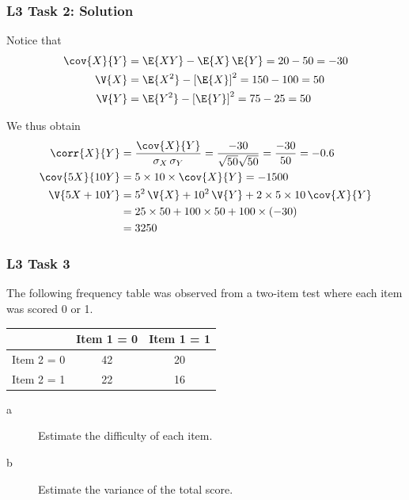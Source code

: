 \documentclass[compress]{beamer}\usepackage[]{graphicx}\usepackage[]{xcolor}
\begin{document}
\begin{frame}[fragile]
  \frametitle{L3 Task 2: Solution}
    Notice that
    \begin{equation*}
      \begin{aligned}
        \cov{X}{Y} &= \E{XY} - \E{X} \, \E{Y} = 20 - 50 = -30 \\
        \V{X} &= \E{X^2} - \left[ \E{X} \right]^2 = 150 - 100 = 50 \\
        \V{Y} &= \E{Y^2} - \left[ \E{Y} \right]^2 = 75 - 25 = 50
      \end{aligned}
    \end{equation*}

    We thus obtain
    \begin{equation*}
      \begin{aligned}
        \corr{X}{Y} &= \frac{\cov{X}{Y}}{\sigma_X \, \sigma_Y} = \frac{-30}{\sqrt{50} \sqrt{50}} = \frac{-30}{50} = -0.6 \\
        \cov{5X}{10Y} &= 5 \times 10 \times \cov{X}{Y} = -1500 \\
        \V{5X + 10Y} &= 5^2\,\V{X} + 10^2\, \V{Y} + 2 \times 5 \times 10\, \cov{X}{Y} \\
          &= 25 \times 50 + 100 \times 50 + 100 \times (-30) \\
          &= 3250
      \end{aligned}
    \end{equation*}
\end{frame}


\begin{frame}[fragile]
  \frametitle{L3 Task 3}
    The following frequency table was observed from a two-item test where each item was scored 0 or 1.

    \begin{center}
      \begin{tabular}{|c|c|c|}
        \hline
        & Item 1 = 0 & Item 1 = 1  \\
        \hline
        Item 2 = 0 & 42 & 20 \\
        \hline
        Item 2 = 1 & 22 & 16 \\
        \hline
      \end{tabular}
    \end{center}

    \begin{description}
      \item[a] Estimate the difficulty of each item.
      \item[b] Estimate the variance of the total score.
    \end{description}
\end{frame}
\end{document}
